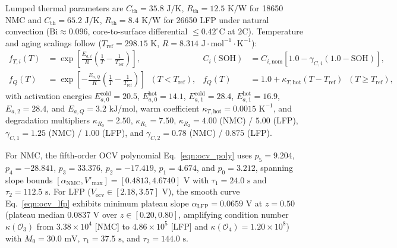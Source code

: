 \documentclass[11pt,a4paper]{article}
\begin{document}
Lumped thermal parameters are $C_{\text{th}} = 35.8\text{ J/K}$, $R_{\text{th}} = 12.5\text{ K/W}$ for 18650 NMC and $C_{\text{th}} = 65.2\text{ J/K}$, $R_{\text{th}} = 8.4\text{ K/W}$ for 26650 LFP under natural convection ($\text{Bi} \approx 0.096$, core-to-surface differential $\le 0.42^\circ\text{C}$ at $2\text{C}$). Temperature and aging scalings follow ($T_{\text{ref}} = 298.15\text{ K}$, $R = 8.314\text{ J}\cdot\text{mol}^{-1}\cdot\text{K}^{-1}$):
\begin{align*}
f_{T,i}(T) &= \exp\!\left[\frac{E_{a,i}}{R}\left(\frac{1}{T} - \frac{1}{T_{\text{ref}}}\right)\right], &
C_i(\text{SOH}) &= C_{i,\text{nom}}\left[1.0 - \gamma_{C,i}(1.0 - \text{SOH})\right], \\
f_Q(T) &= \exp\!\left[-\frac{E_{a,Q}}{R}\left(\frac{1}{T} - \frac{1}{T_{\text{ref}}}\right)\right] \;\; (T < T_{\text{ref}}), &
f_Q(T) &= 1.0 + \kappa_{T,\text{hot}}(T - T_{\text{ref}}) \;\; (T \ge T_{\text{ref}}),
\end{align*}
with activation energies $E_{a,0}^{\text{cold}} = 20.5$, $E_{a,0}^{\text{hot}} = 14.1$, $E_{a,1}^{\text{cold}} = 28.4$, $E_{a,1}^{\text{hot}} = 16.9$, $E_{a,2} = 28.4$, and $E_{a,Q} = 3.2\text{ kJ/mol}$, warm coefficient $\kappa_{T,\text{hot}} = 0.0015\text{ K}^{-1}$, and degradation multipliers $\kappa_{R_0} = 2.50$, $\kappa_{R_1} = 7.50$, $\kappa_{R_2} = 4.00$ (NMC) / $5.00$ (LFP), $\gamma_{C,1} = 1.25$ (NMC) / $1.00$ (LFP), and $\gamma_{C,2} = 0.78$ (NMC) / $0.875$ (LFP).

For NMC, the fifth-order OCV polynomial Eq.~\eqref{eqn:ocv_poly} uses $p_5 = 9.204$, $p_4 = -28.841$, $p_3 = 33.376$, $p_2 = -17.419$, $p_1 = 4.674$, and $p_0 = 3.212$, spanning slope bounds $[\alpha_{\text{NMC}}, V'_{\max}] = [0.4813, 4.6740]\text{ V}$ with $\tau_1 = 24.0\text{ s}$ and $\tau_2 = 112.5\text{ s}$. For LFP ($V_{\text{ocv}} \in [2.18, 3.57]\text{ V}$), the smooth curve Eq.~\eqref{eqn:ocv_lfp} exhibits minimum plateau slope $\alpha_{\text{LFP}} = 0.0659\text{ V}$ at $z = 0.50$ (plateau median $0.0837\text{ V}$ over $z\in[0.20, 0.80]$, amplifying condition number $\kappa(\mathcal{O}_3)$ from $3.38 \times 10^4$ [NMC] to $4.86 \times 10^5$ [LFP] and $\kappa(\mathcal{O}_4) = 1.20 \times 10^8$) with $M_0 = 30.0\text{ mV}$, $\tau_1 = 37.5\text{ s}$, and $\tau_2 = 144.0\text{ s}$.
\end{document}
